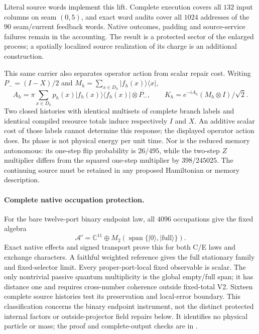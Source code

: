 Literal source words implement this lift. Complete execution covers all
$132$ input columns on seam $(0,5)$, and exact word audits cover all
$1024$ addresses of the $90$ seam/current feedback words. Native outcomes,
padding and source-service failures remain in the accounting. The result
is a protected sector of the enlarged process; a spatially localized
source realization of its charge is an additional construction.

This same carrier also separates operator action from scalar repair cost.
Writing $P_-=(I-X)/2$ and $M_h=\sum_{x\in D_h}|f_h(x)\rangle\langle x|$,
\[
 A_h=\pi\sum_{x\in D_h}p_h(x)
 |f_h(x)\rangle\langle f_h(x)|\otimes P_-,\qquad
 K_h=e^{-iA_h}(M_h\otimes I)/\sqrt2.
\]
Two closed histories with identical multisets of complete branch labels
and identical compiled resource totals induce respectively $I$ and $X$.
An additive scalar cost of those labels cannot determine this response;
the displayed operator action does. Its phase is not physical energy
per unit time. Nor is the reduced memory autonomous: its one-step flip
probability is $26/495$, while the two-step $Z$ multiplier differs from
the squared one-step multiplier by $398/245025$. The continuing source
must be retained in any proposed Hamiltonian or memory description.

\paragraph{Complete native occupation protection.}
For the bare twelve-port binary endpoint law, all $4096$ occupations give
the fixed algebra
\[
 \mathcal A'=\mathbb C^{11}\oplus M_2(\operatorname{span}\{|0\rangle,|\mathrm{full}\rangle\}).
\]
Exact native effects and signed transport prove this for both C/E laws
and exchange characters. A faithful weighted reference gives the full
stationary family and fixed-selector limit. Every proper-port-local fixed
observable is scalar. The only nontrivial passive quantum multiplicity is
the global empty/full span; it has distance one and requires cross-number
coherence outside fixed-total V2. Sixteen complete source histories test
its preservation and local-error boundary. This classification concerns
the binary endpoint instrument, not the distinct protected internal
factors or outside-projector field repairs below. It identifies no physical
particle or mass; the proof and complete-output checks are in
.

